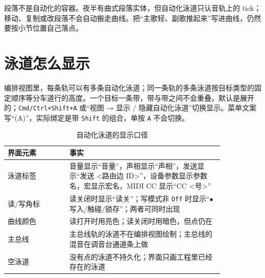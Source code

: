 \begin{center}
\end{center}

段落不是自动化的容器。夜半有曲式段落实体，但自动化泳道只认音轨上的 tick；移动、复制或改段落不会自动搬走曲线。把“主歌轻、副歌推起来”写进曲线，仍然要按小节位置自己落点。

\section{泳道怎么显示}

编排视图里，每条轨可以有多条自动化泳道；同一条轨的多条泳道按目标类型的固定顺序等分车道行的高度。一个目标一条带，带与带之间不会重叠。默认是展开的；\texttt{Cmd/\allowbreak Ctrl+Shift+A} 或“视图 → 显示 / 隐藏自动化泳道”切换显示。菜单文案写“(A)”，实际绑定是带 \texttt{Shift} 的组合，单按 \texttt{A} 不会切换。

\begin{table}[htbp]
\centering
\small
\begin{tabular}{@{}p{0.24\linewidth}p{0.60\linewidth}@{}}
\hline
界面元素 & 事实 \\
\hline
泳道标签 & 音量显示“音量”，声相显示“声相”，发送显示“发送 <路由边 ID>”，设备参数显示参数名，宏显示宏名，MIDI CC 显示“CC <号>” \\
读/写角标 & 读关闭时显示“读关”；写模式非 \texttt{Off} 时显示“$\bullet$ 写入/触碰/锁存”；两者可同时出现 \\
曲线颜色 & 读打开时用亮色；读关闭时用暗色，但点仍在 \\
主总线 & 主总线轨的泳道不在编排视图绘制；主总线的混音在调音台通道条上做 \\
空泳道 & 没有点的泳道不持久化；界面只画工程里已经存在的泳道 \\
\hline
\end{tabular}
\caption{自动化泳道的显示口径}
\label{tab:automation-display}
\end{table}

